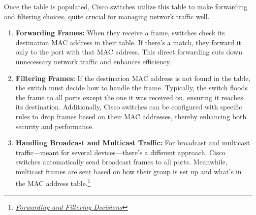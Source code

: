 \documentclass[11pt,a4paper]{article}
\begin{document}
Once the table is populated, Cisco switches utilize this table to make forwarding and filtering choices, quite crucial for managing network traffic well.
\begin{enumerate}
    
    \item \textbf{Forwarding Frames:} When they receive a frame, switches check its destination MAC address in their table. If there's a match, they forward it only to the port with that MAC address. This direct forwarding cuts down unnecessary network traffic and enhances efficiency.

    \item \textbf{Filtering Frames:} If the destination MAC address is not found in the table, the switch must decide how to handle the frame. Typically, the switch floods the frame to all ports except the one it was received on, ensuring it reaches its destination. Additionally, Cisco switches can be configured with specific rules to drop frames based on their MAC addresses, thereby enhancing both security and performance.

    \item \textbf{Handling Broadcast and Multicast Traffic:} For broadcast and multicast traffic—meant for several devices—there's a different approach. Cisco switches automatically send broadcast frames to all ports. Meanwhile, multicast frames are sent based on how their group is set up and what’s in the MAC address table.\footnote{\href{https://www.cisco.com/c/en/us/support/docs/routers/12000-series-routers/47321-ciscoef.html}{\textit{Forwarding and Filtering Decisions}}}

\end{enumerate}
\end{document}
